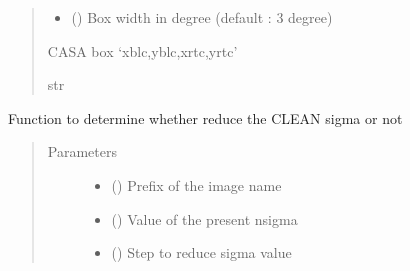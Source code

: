 \documentclass[letterpaper,10pt,english]{sphinxmanual}
\begin{document}
\begin{fulllineitems}
\begin{fulllineitems}
\begin{quote}
\begin{description}
\begin{itemize}
\item {} 
\sphinxAtStartPar
{} () \textendash{} Box width in degree (default : 3 degree)

\end{itemize}

\item[{Returns}] \leavevmode
\sphinxAtStartPar
CASA box ‘xblc,yblc,xrtc,yrtc’

\item[{Return type}] \leavevmode
\sphinxAtStartPar
str

\end{description}\end{quote}

\end{fulllineitems}


\begin{fulllineitems}
\label{\detokenize{paircars:paircars.intensity_selfcal_LTS.IntensitySelfcal.reduce_sigma}}
\sphinxAtStartPar
Function to determine whether reduce the CLEAN sigma or not
\begin{quote}\begin{description}
\item[{Parameters}] \leavevmode\begin{itemize}
\item {} 
\sphinxAtStartPar
{} () \textendash{} Prefix of the image name

\item {} 
\sphinxAtStartPar
{} () \textendash{} Value of the present n\sphinxhyphen{}sigma

\item {} 
\sphinxAtStartPar
{} () \textendash{} Step to reduce sigma value


\end{itemize}
\end{description}
\end{quote}
\end{fulllineitems}
\end{fulllineitems}
\end{document}
